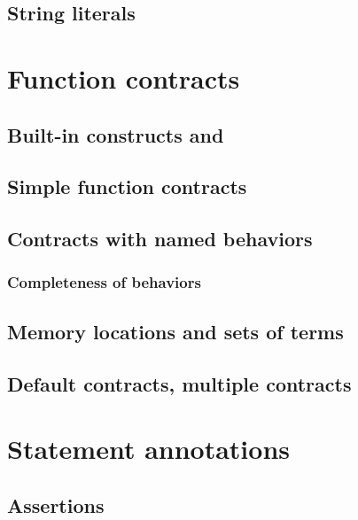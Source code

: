 \subsection{String literals}


\section{Function contracts}
\label{sec:fn-behavior}


\subsection{Built-in constructs %
  \texorpdfstring{\old}{\textbackslash{}old} %
 and \texorpdfstring{\result}{\textbackslash{}result}}


\subsection{Simple function contracts}
\label{sec:simplecontracts}

\subsection{Contracts with named behaviors}
\label{subsec:behaviors}

\subsubsection{Completeness of behaviors}
\label{sec:compl-behav}

\subsection{Memory locations and sets of terms}
\label{sec:locations}

\subsection{Default contracts, multiple contracts}
\label{sec:multiplecontracts}

\section{Statement annotations}

\subsection{Assertions}

